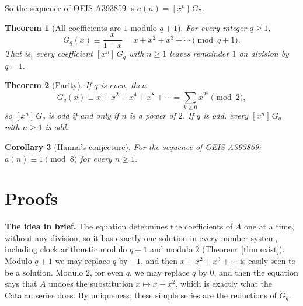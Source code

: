\documentclass[11pt,a4paper]{article}
\newtheorem{theorem}{Theorem}[section]
\newtheorem{corollary}[theorem]{Corollary}
\theoremstyle{definition}
\theoremstyle{remark}
\newcommand{\coeff}[2]{[x^{#1}]\,#2}
\newcommand{\para}[1]{\par\medskip\noindent\textbf{#1}\enspace}
\begin{document}
So the sequence of OEIS A393859 is $a(n)=\coeff{n}{G_{7}}$.

\begin{theorem}[All coefficients are $1$ modulo $q+1$]\label{thm:mod}
For every integer $q\ge1$,
\[
G_q(x)\equiv\frac{x}{1-x}=x+x^2+x^3+\cdots\pmod{q+1}.
\]
That is, every coefficient $\coeff{n}{G_q}$ with $n\ge1$ leaves remainder $1$ on division by $q+1$.
\end{theorem}

\begin{theorem}[Parity]\label{thm:parity}
If $q$ is even, then
\[
G_q(x)\equiv x+x^2+x^4+x^8+\cdots=\sum_{k\ge0}x^{2^k}\pmod 2,
\]
so $\coeff{n}{G_q}$ is odd if and only if $n$ is a power of $2$. If $q$ is odd, every $\coeff{n}{G_q}$ with $n\ge1$
is odd.
\end{theorem}

\begin{corollary}[Hanna's conjecture]\label{cor:oeis}
For the sequence of OEIS A393859: $a(n)\equiv1\pmod{8}$ for every $n\ge1$.
\end{corollary}

\section{Proofs}\label{sec:proofs}

\para{The idea in brief.} The equation determines the coefficients of $A$ one at a time, without any division, so it
has exactly one solution in every number system, including clock arithmetic modulo $q+1$ and modulo $2$
(Theorem~\ref{thm:exist}). Modulo $q+1$ we may replace $q$ by $-1$, and then $x+x^2+x^3+\cdots$ is easily seen to be a
solution. Modulo $2$, for even $q$, we may replace $q$ by $0$, and then the equation says that $A$ undoes the
substitution $x\mapsto x-x^2$, which is exactly what the Catalan series does. By uniqueness, these simple series are
the reductions of $G_q$.
\end{document}
